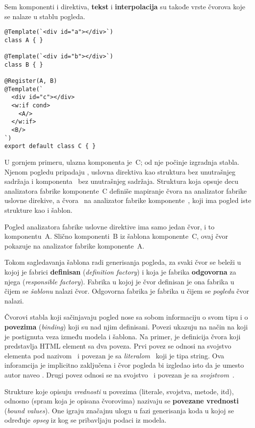 Sem komponenti i direktiva, \textbf{tekst} i \textbf{interpolacija} su takođe vrste čvorova koje se nalaze u stablu pogleda.

\begin{verbatim}
@Template(`<div id="a"></div>`)
class A { }

@Template(`<div id="b"></div>`)
class B { }

@Register(A, B)
@Template(`
  <div id="c"></div>
  <w:if cond>
    <A/>
  </w:if>
  <B/>
`)
export default class C { }
\end{verbatim}

U gornjem primeru, ulazna komponenta je~\code C; od nje počinje izgradnja stabla.
Njenom pogledu pripadaju , uslovna direktiva  kao struktura bez unutrašnjeg sadržaja i komponenta~ bez unutrašnjeg sadržaja.
Struktura koja opsuje decu analizatora fabrike komponente~\code C definiše mapiranje čvora  na analizator fabrike uslovne direkive, a čvora~ na analizator fabrike komponente~, koji ima pogled iste strukture kao i šablon.

Pogled analizatora fabrike uslovne direktive  ima samo jedan čvor, i to komponentu~\code A.
Slično komponenti~\code B iz šablona komponente~\code C, ovaj čvor pokazuje na analizator fabrike komponente~\code A.

Tokom sagledavanja šablona radi generisanja pogleda, za svaki čvor se beleži u kojoj je fabrici \textbf{definisan} (\textsl{definition factory}) i koja je fabrika \textbf{odgovorna} za njega (\textsl{responsible factory}).
Fabrika u kojoj je čvor definisan je ona fabrika u čijem se \textit{šablonu} nalazi čvor.
Odgovorna fabrika je fabrika u čijem se \textit{pogledu} čvor nalazi.

Čvorovi stabla koji sačinjavaju pogled nose sa sobom informaciju o svom tipu i o \textbf{povezima} (\textsl{binding}) koji su nad njim definisani.
Povezi ukazuju na način na koji je postignuta veza između modela i šablona.
Na primer,  je definicija čvora koji predstavlja HTML element sa dva poveza.
Prvi povez se odnosi na svojstvo elementa pod nazivom~ i povezan je sa \textit{literalom}~ koji je tipa string.
Ova inforamcija je implicitno zaključena i čvor pogleda bi izgledao isto da je umesto  autor naveo .
Drugi povez odnosi se na svojstvo~ i povezan je sa \textit{svojstvom}~.

Strukture koje opisuju \emph{vrednosti} u povezima (literale, svojstva, metode, itd), odnosno  (spram  koja je opisana čvorovima) nazivaju se \textbf{povezane vrednosti} (\textsl{bound values}).
One igraju značajnu ulogu u fazi generisanja koda u kojoj se određuje \textit{opseg} iz kog se pribavljaju podaci iz modela.

